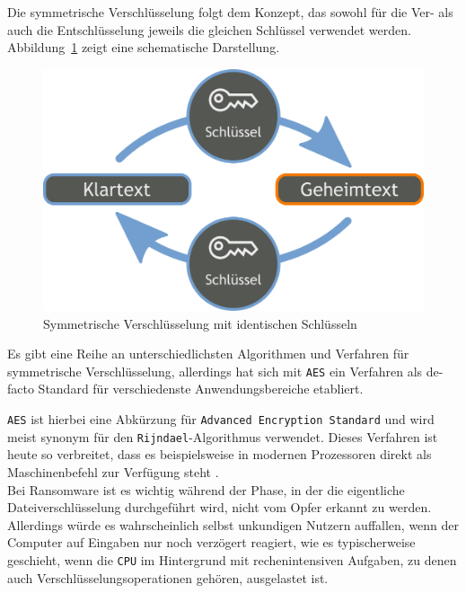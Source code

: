 \label{sec:sym_verschl}

Die symmetrische Verschlüsselung folgt dem Konzept, das sowohl für die Ver- als auch die Entschlüsselung jeweils die gleichen Schlüssel verwendet werden. \\
Abbildung~\ref{fig:sym_verschl} zeigt eine schematische Darstellung.

\begin{figure}[h!]
	\centering
	\includegraphics[scale=0.22]{img/SymKrypto.png}
	\caption{Symmetrische Verschlüsselung mit identischen Schlüsseln \cite{img:crypto:sym}}
	\label{fig:sym_verschl}
\end{figure}

Es gibt eine Reihe an unterschiedlichsten Algorithmen und Verfahren für symmetrische Verschlüsselung, allerdings hat sich mit \texttt{AES} ein Verfahren als de-facto Standard für verschiedenste Anwendungsbereiche etabliert.

\texttt{AES} ist hierbei eine Abkürzung für \texttt{Advanced Encryption Standard} und wird meist synonym für den \texttt{Rijndael}-Algorithmus verwendet. Dieses Verfahren ist heute so verbreitet, dass es beispielsweise in modernen Prozessoren direkt als Maschinenbefehl zur Verfügung steht \cite{crypto:aes_intel}. 
\\

Bei Ransomware ist es wichtig während der Phase, in der die eigentliche Dateiverschlüsselung durchgeführt wird, nicht vom Opfer erkannt zu werden. Allerdings würde es wahrscheinlich selbst unkundigen Nutzern auffallen, wenn der Computer auf Eingaben nur noch verzögert reagiert, wie es typischerweise geschieht, wenn die \texttt{CPU} im Hintergrund mit rechenintensiven Aufgaben, zu denen auch Verschlüsselungsoperationen gehören, ausgelastet ist.

